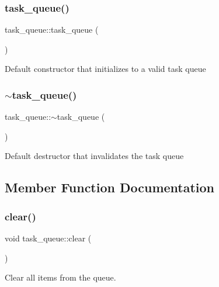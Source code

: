 \subsubsection{\texorpdfstring{task\+\_\+queue()}{task\_queue()}}
{\footnotesize\ttfamily task\+\_\+queue\+::task\+\_\+queue (\begin{DoxyParamCaption}{ }\end{DoxyParamCaption})\hspace{0.3cm}{\ttfamily [inline]}}

Default constructor that initializes to a valid task queue \mbox{\label{classtask__queue_a01f60d69b15bc36bced03f00b9f3d443}} 
\subsubsection{\texorpdfstring{$\sim$task\+\_\+queue()}{~task\_queue()}}
{\footnotesize\ttfamily task\+\_\+queue\+::$\sim$task\+\_\+queue (\begin{DoxyParamCaption}{ }\end{DoxyParamCaption})\hspace{0.3cm}{\ttfamily [inline]}}

Default destructor that invalidates the task queue 

\subsection{Member Function Documentation}
\mbox{\label{classtask__queue_aded81b6de1995651057c306166c8ae8b}} 
\subsubsection{\texorpdfstring{clear()}{clear()}}
{\footnotesize\ttfamily void task\+\_\+queue\+::clear (\begin{DoxyParamCaption}{ }\end{DoxyParamCaption})\hspace{0.3cm}{\ttfamily [inline]}}

Clear all items from the queue. \mbox{\label{classtask__queue_a8febb9f611ff31bc105027c7d90784a6}} 
